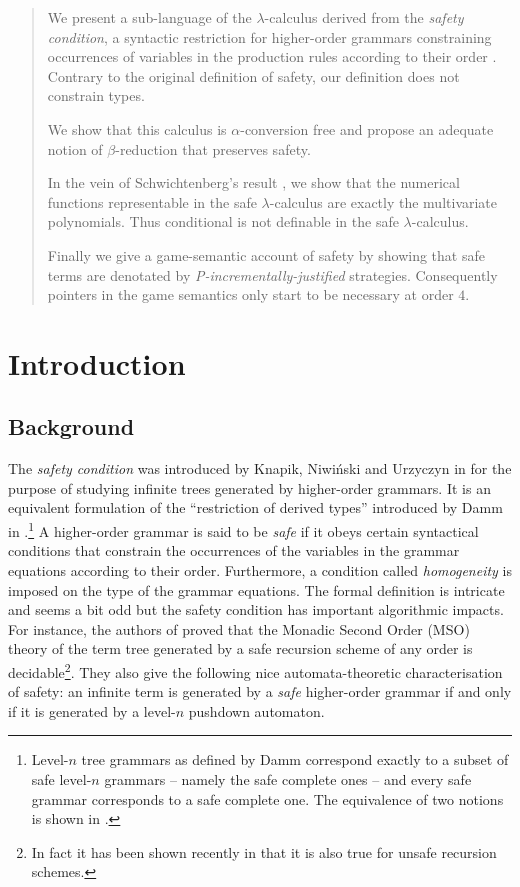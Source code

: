 \documentclass{llncs}
\begin{document}
\begin{abstract}
We present a sub-language of the $\lambda$-calculus derived from the \emph{safety condition}, a syntactic restriction for higher-order grammars constraining occurrences of variables in the production rules according to their order \cite{KNU02}. 
Contrary to the original definition of safety, our definition does not constrain types.
 
We show that this calculus is $\alpha$-conversion free and propose an adequate notion of $\beta$-reduction that preserves safety.

In the vein of Schwichtenberg's result 
\cite{citeulike:622637}, we show that the numerical functions representable in the safe $\lambda$-calculus are exactly the multivariate polynomials. Thus conditional is not definable in the safe $\lambda$-calculus.

Finally we give a game-semantic account of safety by showing that safe terms are denotated by \emph{P-incrementally-justified} strategies. 
Consequently pointers in the game semantics only start to be necessary at order $4$.
\end{abstract}


\section{Introduction}

\subsection{Background}

The \emph{safety condition} was introduced by Knapik, Niwi{\'n}ski and Urzyczyn in \cite{KNU02} for the purpose of studying infinite trees generated by higher-order grammars.
It is an equivalent formulation of the ``restriction of derived types'' introduced by Damm in \cite{Dam82}.\footnote{Level-$n$ tree grammars as defined by Damm correspond exactly to a subset of safe level-$n$ grammars -- namely the safe complete ones -- and every safe grammar corresponds to a safe complete one. The equivalence of two notions is shown in \cite{demirandathesis}.}
A higher-order grammar is said to be \emph{safe} if it obeys certain syntactical conditions that constrain the occurrences of the variables in the grammar equations according to their order. Furthermore, a condition called \emph{homogeneity} is imposed on the type of the grammar equations.
The formal definition is intricate and seems a bit odd but the safety condition has important algorithmic impacts.
For instance, the authors of \cite{KNU02} proved that the Monadic Second Order (MSO) theory of the term tree generated by a safe recursion scheme of any order is decidable\footnote{In fact it has been shown recently in \cite{OngLics2006} that it is also true for unsafe recursion schemes.}. They also give the following nice automata-theoretic characterisation of safety:
an infinite term is generated by a \emph{safe} higher-order grammar if and only if it is generated by a level-$n$ pushdown automaton.
\end{document}
